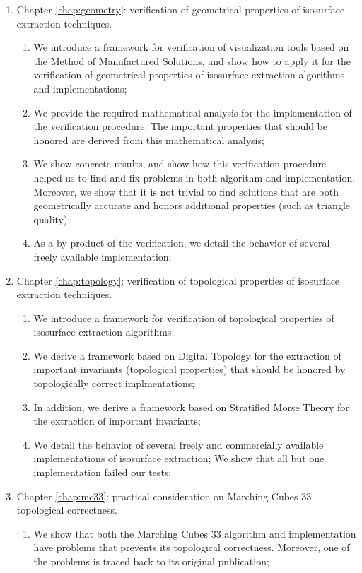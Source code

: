 \begin{enumerate}
\item Chapter \ref{chap:geometry}: verification of geometrical properties of isosurface extraction techniques.
\begin{enumerate}
\item We introduce a framework for verification of visualization tools based on the Method of Manufactured Solutions, and show how to apply it for the verification of geometrical properties of isosurface extraction algorithms and implementations;
\item We provide the required mathematical analysis for the implementation of the verification procedure. The important properties that should be honored are derived from this mathematical analysis;
\item We show concrete results, and show how this verification procedure helped us to find and fix problems in both algorithm and implementation. Moreover, we show that it is not trivial to find solutions that are both geometrically accurate and honors additional properties (such as triangle quality);
\item As a by-product of the verification, we detail the behavior of several freely available implementation;
\end{enumerate}
\item Chapter \ref{chap:topology}: verification of topological properties of isosurface extraction techniques.
\begin{enumerate}
\item We introduce a framework for verification of topological properties of isosurface extraction algorithms;
\item We derive a framework based on Digital Topology for the extraction of important invariants (topological properties) that should be honored by topologically correct implmentations;
\item In addition, we derive a framework based on Stratified Morse Theory for the extraction of important invariants;
\item We detail the behavior of several freely and commercially available implementations of isosurface extraction; We show that all but one implementation failed our tests;
\end{enumerate}
\item Chapter \ref{chap:mc33}: practical consideration on Marching Cubes 33 topological correctness.
\begin{enumerate}
\item We show that both the Marching Cubes 33 algorithm and implementation have problems that prevents its topological correctness. Moreover, one of the problems is traced back to its original publication;

\end{enumerate}
\end{enumerate}
